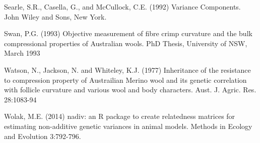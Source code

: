 \documentclass[titlepage]{article}  %
\begin{document}
\begin{thebibliography}{99}
Searle, S.R., Casella, G., and McCullock, C.E. (1992) Variance Components.
    John Wiley and Sons, New York.


Swan, P.G. (1993) Objective measurement of fibre crimp curvature and the bulk compressional properties of Australian wools. PhD Thesis, University of NSW, March 1993 

Watson, N., Jackson, N. and Whiteley, K.J. (1977) Inheritance of the resistance
    to compression property of Austrailian Merino wool and its genetic 
    correlation with follicle curvature and various wool and body 
    characters. Aust. J. Agric. Res. 28:1083-94

Wolak, M.E. (2014) nadiv: an R package to create relatedness matrices for
    estimating non-additive genetic variances in animal models.
    Methods in Ecology and Evolution 3:792-796.

\end{thebibliography}

%
%
%
%
%
%
%
\end{document}
